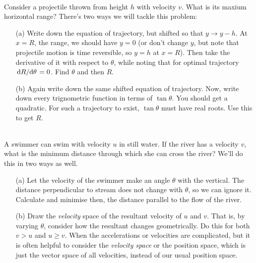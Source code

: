     \begin{exc}
        \begin{exercise}[subtitle={Projectile from a height}, points = 3]
            \smallskip
            ~\\
            Consider a projectile thrown from height $h$ with velocity $v$. What is its maxium horizontal range?
            There's two ways we will tackle this problem:

            \begin{enumerate}
                \item[(a)] Write down the equation of trajectory, but shifted so that $y \to y - h$. At $x = R$, the range,
                 we should have $y = 0$ (or don't change $y$, but note that projectile motion is time reversible, so $y=h$ at 
                 $x = R$). Then take the derivative of it with respect to $\theta$, while noting that for optimal trajectory 
                 $\dv*{R}{\theta} = 0$. Find $\theta$ and then $R$.
                 \item[(b)] Again write down the same shifted equation of trajectory. Now, write down every trignometric function
                 in terms of $\tan\theta$. You should get a quadratic. For such a trajectory to exist, $\tan\theta$ must have 
                 real roots. Use this to get $R$. 
            \end{enumerate}
            \label{exc: wedge-projectile}
        \end{exercise}

        \begin{exercise}[subtitle={River and Drift}, points = 2]
            \smallskip
            ~\\
            A swimmer can swim with velocity $u$ in still water. If the river has a velocity $v$, what is the minimum 
            distance through which she can cross the river? We'll do this in two ways as well.
            \begin{enumerate}
                \item[(a)] Let the velocity of the swimmer make an angle $\theta$ with the vertical. The distance perpendicular 
                to stream does not change with $\theta$, so we can ignore it. Calculate and minimise then, the distance 
                parallel to the flow of the river.
                \item[(b)] Draw the \emph{velocity} space of the resultant velocity of $u$ and $v$. That is, by varying $\theta$,
                consider how the resultant changes geometrically. Do this for both $v > u$ and $u \ge v$.  
                When the accelerations or velocities are complicated, but it is often helpful 
                to consider the \emph{velocity space} or the position space, which is just the vector space of all velocities, instead 
                of our usual position space.
            

\end{enumerate}
\end{exercise}
\end{exc}

